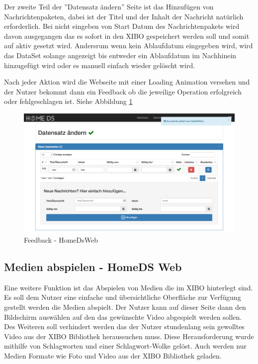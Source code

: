 Der zweite Teil der ''Datensatz ändern'' Seite ist das Hinzufügen von Nachrichtenpaketen, dabei ist der Titel und der Inhalt der Nachricht natürlich erforderlich. Bei nicht eingeben von Start Datum des Nachrichtenpakets wird davon ausgegangen das es sofort in den XIBO gespeichert werden soll und somit auf aktiv gesetzt wird. Andersrum wenn kein Ablaufdatum eingegeben wird, wird das DataSet solange angezeigt bis entweder ein Ablaufdatum im Nachhinein hinzugefügt wird oder es manuell einfach wieder gelöscht wird.

Nach jeder Aktion wird die Webseite mit einer Loading Animation versehen und der Nutzer bekommt dann ein Feedback ob die jeweilige Operation erfolgreich oder fehlgeschlagen ist. Siehe Abbildung \ref{img:feedback}

\begin{figure}[H]
\centering
\includegraphics[width=1\textwidth]{images/08_HomeDsWeb/Message.png}
\caption{Feedback - HomeDsWeb}
\label{img:feedback}
\end{figure}

\subsection{Medien abspielen - HomeDS Web}\label{sec:playmedia}
Eine weitere Funktion ist das Abspielen von Medien die im XIBO hinterlegt sind. Es soll dem Nutzer eine einfache und übersichtliche Oberfläche zur Verfügung gestellt werden die Medien abspielt. Der Nutzer kann auf dieser Seite dann den Bildschirm auswählen auf den das gewünschte Video abgespielt werden sollen. Des Weiteren soll verhindert werden das der Nutzer stundenlang sein gewolltes Video aus der XIBO Bibliothek heraussuchen muss. Diese Herausforderung wurde mithilfe von Schlagworten und einer Schlagwort-Wolke gelöst. Auch werden nur Medien Formate wie Foto und Video aus der XIBO Bibliothek geladen.

